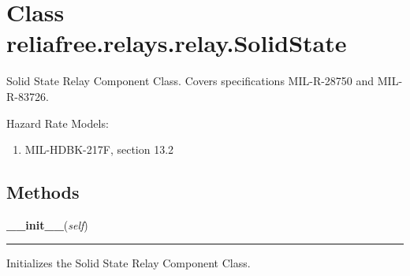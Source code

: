 %
%
%


\section{Class reliafree.relays.relay.SolidState}

    \label{reliafree:relays:relay:SolidState}
Solid State Relay Component Class. Covers specifications MIL-R-28750 and 
MIL-R-83726.

Hazard Rate Models:

\begin{enumerate}

\setlength{\parskip}{0.5ex}
  \item MIL-HDBK-217F, section 13.2

\end{enumerate}



  \subsection{Methods}

    \label{reliafree:relays:relay:SolidState:__init__}

    \vspace{0.5ex}

\hspace{.8\funcindent}\begin{boxedminipage}{\funcwidth}

    \raggedright \textbf{\_\_init\_\_}(\textit{self})

    \vspace{-1.5ex}

    \rule{\textwidth}{0.5\fboxrule}
\setlength{\parskip}{2ex}
    Initializes the Solid State Relay Component Class.

\setlength{\parskip}{1ex}
    \end{boxedminipage}

